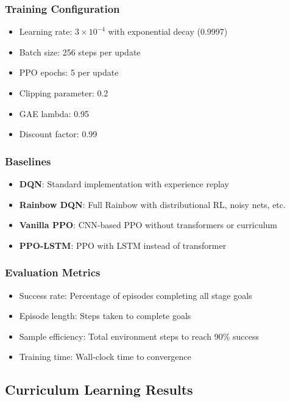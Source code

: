 \documentclass[12pt,a4paper]{article}
\begin{document}
\subsubsection{Training Configuration}
\begin{itemize}
    \item Learning rate: $3 \times 10^{-4}$ with exponential decay (0.9997)
    \item Batch size: 256 steps per update
    \item PPO epochs: 5 per update
    \item Clipping parameter: 0.2
    \item GAE lambda: 0.95
    \item Discount factor: 0.99
\end{itemize}

\subsubsection{Baselines}
\begin{itemize}
    \item \textbf{DQN}: Standard implementation with experience replay
    \item \textbf{Rainbow DQN}: Full Rainbow with distributional RL, noisy nets, etc.
    \item \textbf{Vanilla PPO}: CNN-based PPO without transformers or curriculum
    \item \textbf{PPO-LSTM}: PPO with LSTM instead of transformer
\end{itemize}

\subsubsection{Evaluation Metrics}
\begin{itemize}
    \item Success rate: Percentage of episodes completing all stage goals
    \item Episode length: Steps taken to complete goals
    \item Sample efficiency: Total environment steps to reach 90\% success
    \item Training time: Wall-clock time to convergence
\end{itemize}

\subsection{Curriculum Learning Results}
\end{document}
